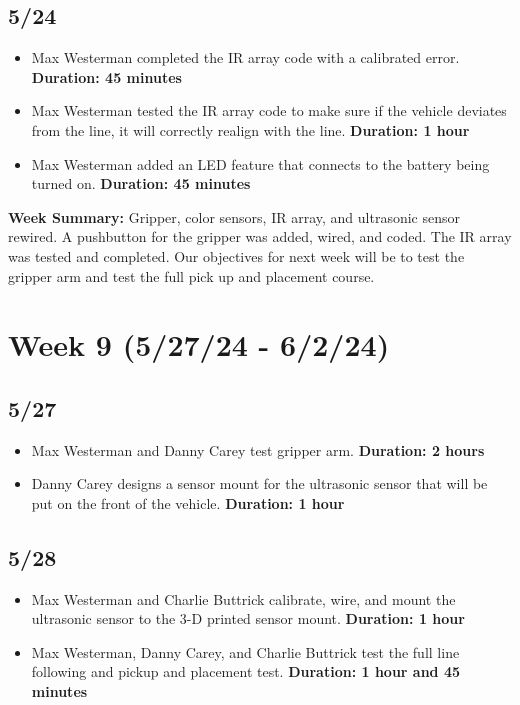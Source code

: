 \documentclass[11pt]{report}
\begin{document}
\subsection*{5/24}

\begin{itemize}
    \item Max Westerman completed the \gls{IR} array code with a calibrated error. \textbf{Duration: 45 minutes}
    \item Max Westerman tested the \gls{IR} array code to make sure if the vehicle deviates from the line, it will correctly realign with the line. \textbf{Duration: 1 hour}
    \item Max Westerman added an \gls{LED} feature that connects to the battery being turned on. \textbf{Duration: 45 minutes}
\end{itemize}

\textbf{Week Summary:} Gripper, color sensors, \gls{IR} array, and ultrasonic sensor rewired. A pushbutton for the gripper was added, wired, and coded. The \gls{IR} array was tested and completed. Our objectives for next week will be to test the gripper arm and test the full pick up and placement course.

\section{Week 9 (5/27/24 - 6/2/24)}
\subsection*{5/27}

\begin{itemize}
    \item Max Westerman and Danny Carey test gripper arm. \textbf{Duration: 2 hours}
    \item Danny Carey designs a sensor mount for the ultrasonic sensor that will be put on the front of the vehicle. \textbf{Duration: 1 hour}
\end{itemize}

\subsection*{5/28}

\begin{itemize}
    \item Max Westerman and Charlie Buttrick calibrate, wire, and mount the ultrasonic sensor to the 3-D printed sensor mount. \textbf{Duration: 1 hour}
    \item Max Westerman, Danny Carey, and Charlie Buttrick test the full line following and pickup and placement test. \textbf{Duration: 1 hour and 45 minutes}
\end{itemize}
\end{document}
